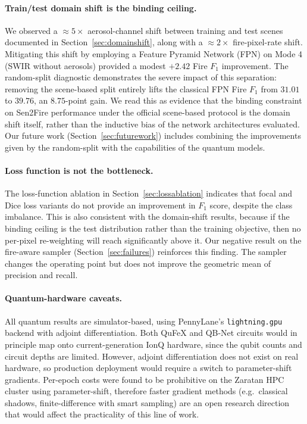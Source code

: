\documentclass{article}
\begin{document}
\paragraph{Train/test domain shift is the binding ceiling.} We observed a $\approx 5\times$ aerosol-channel shift between training and test scenes documented in Section~\ref{sec:domainshift}, along with a $\approx 2\times$ fire-pixel-rate shift. Mitigating this shift by employing a Feature Pyramid Network (FPN) on Mode 4 (SWIR without aerosols) provided a modest $+2.42$ Fire $F_1$ improvement. The random-split diagnostic demonstrates the severe impact of this separation: removing the scene-based split entirely lifts the classical FPN Fire $F_1$ from $31.01$ to $39.76$, an $8.75$-point gain. We read this as evidence that the binding constraint on Sen2Fire performance under the official scene-based protocol is the domain shift itself, rather than the inductive bias of the network architectures evaluated. Our future work (Section~\ref{sec:futurework}) includes combining the improvements given by the random-split with the capabilities of the quantum models.

\paragraph{Loss function is not the bottleneck.} The loss-function ablation in Section~\ref{sec:lossablation} indicates that focal and Dice loss variants do not provide an improvement in $F_1$ score, despite the class imbalance. This is also consistent with the domain-shift results, because if the binding ceiling is the test distribution rather than the training objective, then no per-pixel re-weighting will reach significantly above it. Our negative result on the fire-aware sampler (Section~\ref{sec:failures}) reinforces this finding. The sampler changes the operating point but does not improve the geometric mean of precision and recall.

\paragraph{Quantum-hardware caveats.} All quantum results are simulator-based, using PennyLane's \texttt{lightning.gpu} backend with adjoint differentiation. Both QuFeX and QB-Net circuits would in principle map onto current-generation IonQ hardware, since the qubit counts and circuit depths are limited. However, adjoint differentiation does not exist on real hardware, so production deployment would require a switch to parameter-shift gradients. Per-epoch costs were found to be prohibitive on the Zaratan HPC cluster using parameter-shift, therefore faster gradient methods (e.g.\ classical shadows, finite-difference with smart sampling) are an open research direction that would affect the practicality of this line of work.
\end{document}

